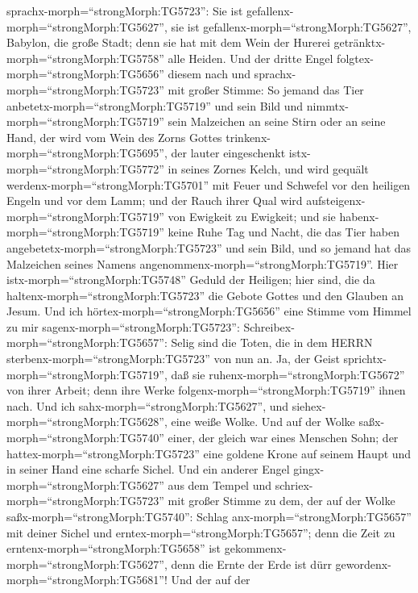 sprachx-morph=``strongMorph:TG5723'': Sie ist
gefallenx-morph=``strongMorph:TG5627'', sie ist
gefallenx-morph=``strongMorph:TG5627'', Babylon, die große Stadt; denn
sie hat mit dem Wein der Hurerei getränktx-morph=``strongMorph:TG5758''
alle Heiden.  Und der dritte Engel
folgtex-morph=``strongMorph:TG5656'' diesem nach und
sprachx-morph=``strongMorph:TG5723'' mit großer Stimme: So jemand das
Tier anbetetx-morph=``strongMorph:TG5719'' und sein Bild und
nimmtx-morph=``strongMorph:TG5719'' sein Malzeichen an seine Stirn oder
an seine Hand,  der wird vom Wein des Zorns Gottes
trinkenx-morph=``strongMorph:TG5695'', der lauter eingeschenkt
istx-morph=``strongMorph:TG5772'' in seines Zornes Kelch, und wird
gequält werdenx-morph=``strongMorph:TG5701'' mit Feuer und Schwefel vor
den heiligen Engeln und vor dem Lamm;  und der Rauch ihrer
Qual wird aufsteigenx-morph=``strongMorph:TG5719'' von Ewigkeit zu
Ewigkeit; und sie habenx-morph=``strongMorph:TG5719'' keine Ruhe Tag und
Nacht, die das Tier haben angebetetx-morph=``strongMorph:TG5723'' und
sein Bild, und so jemand hat das Malzeichen seines Namens
angenommenx-morph=``strongMorph:TG5719''.  Hier
istx-morph=``strongMorph:TG5748'' Geduld der Heiligen; hier sind, die da
haltenx-morph=``strongMorph:TG5723'' die Gebote Gottes und den Glauben
an Jesum.  Und ich hörtex-morph=``strongMorph:TG5656'' eine
Stimme vom Himmel zu mir sagenx-morph=``strongMorph:TG5723'':
Schreibex-morph=``strongMorph:TG5657'': Selig sind die Toten, die in dem
HERRN sterbenx-morph=``strongMorph:TG5723'' von nun an. Ja, der Geist
sprichtx-morph=``strongMorph:TG5719'', daß sie
ruhenx-morph=``strongMorph:TG5672'' von ihrer Arbeit; denn ihre Werke
folgenx-morph=``strongMorph:TG5719'' ihnen nach.  Und ich
sahx-morph=``strongMorph:TG5627'', und
siehex-morph=``strongMorph:TG5628'', eine weiße Wolke. Und auf der Wolke
saßx-morph=``strongMorph:TG5740'' einer, der gleich war eines Menschen
Sohn; der hattex-morph=``strongMorph:TG5723'' eine goldene Krone auf
seinem Haupt und in seiner Hand eine scharfe Sichel.  Und
ein anderer Engel gingx-morph=``strongMorph:TG5627'' aus dem Tempel und
schriex-morph=``strongMorph:TG5723'' mit großer Stimme zu dem, der auf
der Wolke saßx-morph=``strongMorph:TG5740'': Schlag
anx-morph=``strongMorph:TG5657'' mit deiner Sichel und
erntex-morph=``strongMorph:TG5657''; denn die Zeit zu
erntenx-morph=``strongMorph:TG5658'' ist
gekommenx-morph=``strongMorph:TG5627'', denn die Ernte der Erde ist dürr
gewordenx-morph=``strongMorph:TG5681''!  Und der auf der
